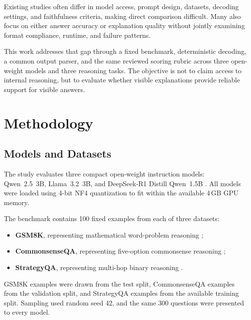 \documentclass{article}
\begin{document}
Existing studies often differ in model access, prompt design, datasets,
decoding settings, and faithfulness criteria, making direct comparison
difficult. Many also focus on either answer accuracy or explanation
quality without jointly examining format compliance, runtime, and
failure patterns.

This work addresses that gap through a fixed benchmark, deterministic
decoding, a common output parser, and the same reviewed scoring rubric
across three open-weight models and three reasoning tasks. The objective
is not to claim access to internal reasoning, but to evaluate whether
visible explanations provide reliable support for visible answers.




\section{Methodology}

\subsection{Models and Datasets}

The study evaluates three compact open-weight instruction models:
Qwen~2.5~3B, Llama~3.2~3B, and DeepSeek-R1 Distill Qwen~1.5B
\cite{qwen2024qwen25,grattafiori2024llama3,deepseek2025r1}.
All models were loaded using 4-bit NF4 quantization to fit within the
available 4\,GB GPU memory.

The benchmark contains 100 fixed examples from each of three datasets:

\begin{itemize}
    \item \textbf{GSM8K}, representing mathematical word-problem
    reasoning \cite{cobbe2021gsm8k};

    \item \textbf{CommonsenseQA}, representing five-option commonsense
    reasoning \cite{talmor2019commonsenseqa};

    \item \textbf{StrategyQA}, representing multi-hop binary reasoning
    \cite{geva2021strategyqa}.
\end{itemize}

GSM8K examples were drawn from the test split, CommonsenseQA examples
from the validation split, and StrategyQA examples from the available
training split. Sampling used random seed 42, and the same 300 questions
were presented to every model.
\end{document}
